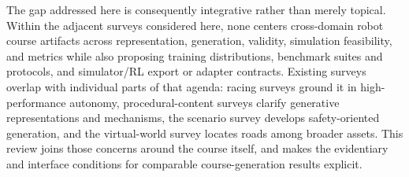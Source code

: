 The gap addressed here is consequently integrative rather than merely topical.
Within the adjacent surveys considered here, none centers cross-domain robot
course artifacts across representation, generation, validity, simulation
feasibility, and metrics while also proposing training distributions, benchmark
suites and protocols, and simulator/RL export or adapter contracts. Existing surveys
overlap with individual parts of that agenda: racing surveys ground it in
high-performance autonomy, procedural-content surveys clarify generative
representations and mechanisms, the scenario survey develops safety-oriented
generation, and the virtual-world survey locates roads among broader assets. This
review joins those concerns around the course itself, and makes the evidentiary
and interface conditions for comparable course-generation results explicit.

